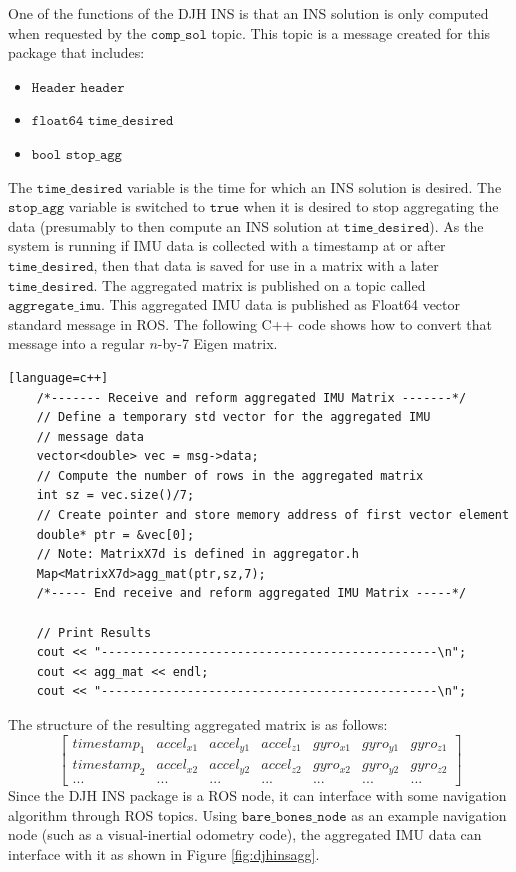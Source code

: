 \documentclass[11pt,a4paper]{article}
\begin{document}
One of the functions of the DJH INS is that an INS solution is only computed when requested by the $\texttt{comp\_sol}$ topic. This topic is a message created for this package that includes:
\begin{itemize}
	\item $\texttt{Header	header}$
	\item $\texttt{float64	time\_desired}$
	\item $\texttt{bool		stop\_agg}$
\end{itemize}
The $\texttt{time\_desired}$ variable is the time for which an INS solution is desired. The $\texttt{stop\_agg}$ variable is switched to $\texttt{true}$ when it is desired to stop aggregating the data (presumably to then compute an INS solution at $\texttt{time\_desired}$). As the system is running if IMU data is collected with a timestamp at or after $\texttt{time\_desired}$, then that data is saved for use in a matrix with a later $\texttt{time\_desired}$. The aggregated matrix is published on a topic called $\texttt{aggregate\_imu}$. This aggregated IMU data is published as Float64 vector standard message in ROS. The following C++ code shows how to convert that message into a regular $n$-by-7 Eigen matrix.
\begin{lstlisting}[frame=single,breaklines] [language=c++]
    /*------- Receive and reform aggregated IMU Matrix -------*/
    // Define a temporary std vector for the aggregated IMU 
    // message data
    vector<double> vec = msg->data;
    // Compute the number of rows in the aggregated matrix
    int sz = vec.size()/7;
    // Create pointer and store memory address of first vector element
    double* ptr = &vec[0];
    // Note: MatrixX7d is defined in aggregator.h
    Map<MatrixX7d>agg_mat(ptr,sz,7);
    /*----- End receive and reform aggregated IMU Matrix -----*/

    // Print Results
    cout << "-----------------------------------------------\n";
    cout << agg_mat << endl;
    cout << "-----------------------------------------------\n";
\end{lstlisting}
The structure of the resulting aggregated matrix is as follows:
\begin{equation}
	\left[\begin{array}{ccccccc}
		timestamp_1 & accel_{x1} & accel_{y1} & accel_{z1} & gyro_{x1} &  gyro_{y1} & gyro_{z1} \\
		timestamp_2 & accel_{x2} & accel_{y2} & accel_{z2} & gyro_{x2} &  gyro_{y2} & gyro_{z2} \\
		... & ... & ... & ... & ... & ... & ...
	\end{array}\right]
\end{equation}
Since the DJH INS package is a ROS node, it can interface with some navigation algorithm through ROS topics. Using $\texttt{bare\_bones\_node}$ as an example navigation node (such as a visual-inertial odometry code), the aggregated IMU data can interface with it as shown in Figure \ref{fig:djhinsagg}.
\end{document}
